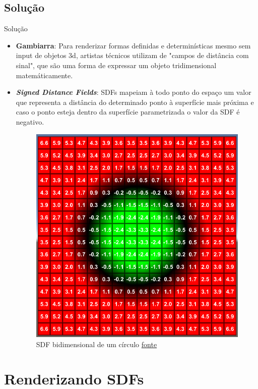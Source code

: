 \documentclass[2pt]{beamer} %
\begin{document}

\subsection{Solução}
\begin{frame}{Solução}


\begin{itemize}
    \item \textbf{Gambiarra}: Para renderizar formas definidas e determinísticas mesmo sem input de objetos 3d, artistas técnicos utilizam de "campos de distância com sinal", que são uma forma de expressar um objeto tridimensional matemáticamente.
    
    \item \textbf{\textit{Signed Distance Fields}}: SDFs mapeiam à todo ponto do espaço um valor que representa a distância do determinado ponto à superfície mais próxima e caso o ponto esteja dentro da superfície parametrizada o valor da SDF é negativo.
\begin{figure}
    \centering
    \includegraphics[width=0.25\linewidth]{imgs/SDF.png}
    \caption{SDF bidimensional de um círculo \href{https://shaderfun.com/2018/03/25/signed-distance-fields-part-2-solid-geometry/}{fonte}}
    \label{fig:enter-label}
\end{figure}
    
\end{itemize}



\end{frame}


\section{Renderizando SDFs}
\end{document}
